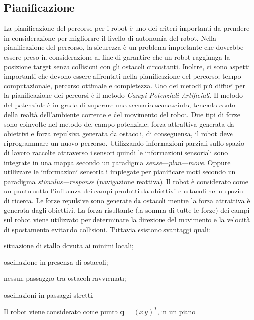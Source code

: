 \subsection{Pianificazione}
\label{ssec:ArtPotField}
La pianificazione del percorso per i robot è uno dei criteri importanti da
prendere in considerazione per migliorare il livello di autonomia del robot.
Nella pianificazione del percorso, la sicurezza è un problema importante che 
dovrebbe essere preso in considerazione al fine di garantire che un robot 
raggiunga la posizione target senza collisioni con gli ostacoli circostanti.
Inoltre, ci sono aspetti importanti che devono essere affrontati nella 
pianificazione del percorso; tempo computazionale, percorso ottimale e 
completezza. 
Uno dei metodi più diffusi per la pianificazione dei percorsi è il metodo 
\emph{Campi Potenziali Artificiali}. 
Il metodo del potenziale è in grado di superare uno scenario sconosciuto, 
tenendo conto della realtà dell'ambiente corrente e del movimento del robot. 
Due tipi di forze sono coinvolte nel metodo del campo potenziale; forza attrattiva 
generata da obiettivi e forza repulsiva generata da ostacoli, di conseguenza, 
il robot deve riprogrammare un nuovo percorso\cite{apotetianfield}.
Utilizzando informazioni parziali sullo spazio di lavoro raccolte attraverso i 
sensori quindi le informazioni sensoriali sono integrate in una mappa secondo un 
paradigma \emph{sense---plan---move}.
Oppure utilizzare le informazioni sensoriali impiegate per pianificare moti 
secondo un paradigma \emph{stimulus---response} (navigazione reattiva).
Il robot è considerato come un punto sotto l'influenza dei campi prodotti da 
obiettivi e ostacoli nello spazio di ricerca. Le forze repulsive sono generate 
da ostacoli mentre la forza attrattiva è generata dagli obiettivi. La forza 
risultante (la somma di tutte le forze) dei campi sul robot viene utilizzato 
per determinare la direzione del movimento e la velocità di spostamento evitando 
collisioni\cite{5498220}.
Tuttavia esistono svantaggi quali:
\begin{enumerate*}[label={\alph*)},font={\bfseries}]
\item situazione di stallo dovuta ai minimi locali; 
\item oscillazione in presenza di ostacoli; 
\item nessun passaggio tra ostacoli ravvicinati; 
\item oscillazioni in passaggi stretti\cite{131810}.
\end{enumerate*}
Il robot viene considerato come punto $\mathbf{q} = (x \, y)^T$, in un piano 
